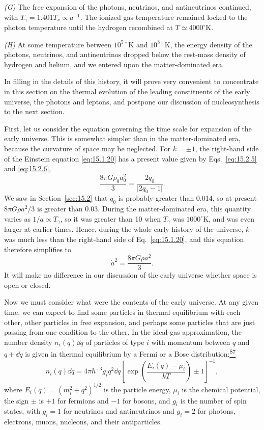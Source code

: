 \emph{(G)} The free expansion of the photons, neutrinos, and antineutrinos
continued, with \(T_\gamma=1.401T_\nu\propto a^{-1}\). The ionized gas
temperature remained locked to the photon temperature until the hydrogen
recombined at \(T\simeq4000^\circ\mathrm K\).

\emph{(H)} At some temperature between \(10^{5\,\circ}\mathrm K\) and
\(10^{8\,\circ}\mathrm K\), the energy density of the photons, neutrinos, and
antineutrinos dropped below the rest-mass density of hydrogen and helium, and
we entered upon the matter-dominated era.

In filling in the details of this history, it will prove very convenient to
concentrate in this section on the thermal evolution of the leading
constituents of the early universe, the photons and leptons, and postpone our
discussion of nucleosynthesis to the next section.

First, let us consider the equation governing the time scale for expansion of
the early universe. This is somewhat simpler than in the matter-dominated era,
because the curvature of space may be neglected. For \(k=\pm1\), the
right-hand side of the Einstein equation \eqref{eq:15.1.20} has a present value
given by Eqs.~\eqref{eq:15.2.5} and \eqref{eq:15.2.6},
\[
  \frac{8\pi G\rho_0a_0^2}{3}
  =
  \frac{2q_0}{\lvert 2q_0-1\rvert}.
\]
We saw in Section~\ref{sec:15.2} that \(q_0\) is probably greater than
0.014, so at present \(8\pi G\rho a^2/3\) is greater than 0.03. During the
matter-dominated era, this quantity varies as \(1/a\propto T_\gamma\), so it
was greater than 10 when \(T_\gamma\) was \(1000^\circ\mathrm K\), and was
even larger at earlier times. Hence, during the whole early history of the
universe, \(k\) was much less than the right-hand side of
Eq.~\eqref{eq:15.1.20}, and this equation therefore simplifies to
\begin{equation}
  \dot a^2=\frac{8\pi G\rho a^2}{3}.
  \tag{15.6.2}\label{eq:15.6.2}
\end{equation}
It will make no difference in our discussion of the early universe whether
space is open or closed.

Now we must consider what were the contents of the early universe. At any
given time, we can expect to find some particles in thermal equilibrium with
each other, other particles in free expansion, and perhaps some particles that
are just passing from one condition to the other. In the ideal-gas
approximation, the number density \(n_i(q)\dd q\) of particles of type \(i\)
with momentum between \(q\) and \(q+\dd q\) is given in thermal equilibrium by
a Fermi or a Bose distribution:\hyperref[ch15-ref-87]{\textsuperscript{87}}
\begin{equation}
  n_i(q)\dd q
  =
  4\pi h^{-3}g_iq^2\dd q
  \left[
    \exp\left(\frac{E_i(q)-\mu_i}{kT}\right)\pm1
  \right]^{-1},
  \tag{15.6.3}\label{eq:15.6.3}
\end{equation}
where \(E_i(q)=(m_i^2+q^2)^{1/2}\) is the particle energy, \(\mu_i\) is the
chemical potential, the sign \(\pm\) is \(+1\) for fermions and \(-1\) for
bosons, and \(g_i\) is the number of spin states, with \(g_i=1\) for neutrinos
and antineutrinos and \(g_i=2\) for photons, electrons, muons, nucleons, and
their antiparticles.

